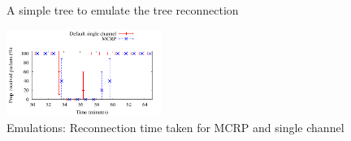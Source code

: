 \begin{figure}
\caption{A simple tree to emulate the tree reconnection}
\label{fig:reconnectionLayout}
\end{figure}

\begin{figure}
\centering
\includegraphics[width=0.45\textwidth]{figures/reconnect.pdf}
\caption{Emulations: Reconnection time taken for MCRP and single channel}
\label{fig:reconnection}
\end{figure}

